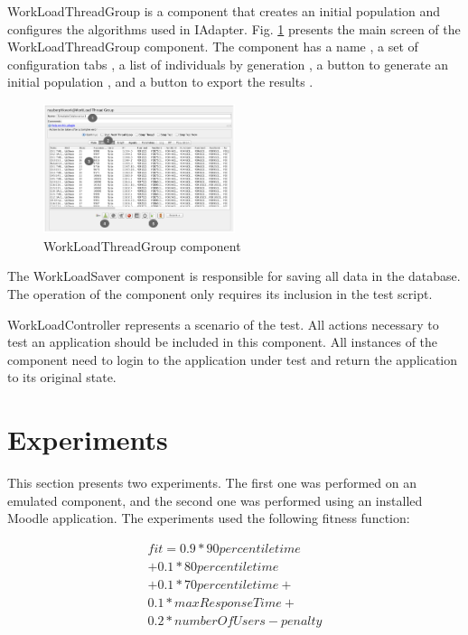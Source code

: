 \documentclass[conference]{IEEEtran}
\begin{document}
 
WorkLoadThreadGroup is a component that creates an initial population and configures the algorithms used in IAdapter. Fig. \ref{fig:tela1iadapter} presents the main screen of the WorkLoadThreadGroup component. The component has a name , a set of configuration tabs , a list of individuals by generation , a button to generate an initial population , and a button to export the results .

\begin{figure}[h]
\includegraphics[width=0.5\textwidth]{./images/tela1iadapter.png}
\caption{WorkLoadThreadGroup component}
\label{fig:tela1iadapter}
\end{figure}

The WorkLoadSaver component is responsible for saving all data in the database. The operation of the component only requires its inclusion in the test script.

WorkLoadController represents a scenario of the test. All actions necessary to test an application should be included in this component. All instances of the component need to login to the application under test and return the application to its original state.




\section{Experiments}

This section presents two experiments. The first one was performed on an emulated component, and the second one was performed using an installed Moodle application. The experiments used the following fitness function:

\begin{equation}
\begin{aligned}
fit=0.9* 90percentiletime\\
+0.1*80percentiletime\\+
0.1*70percentiletime+\\
0.1*maxResponseTime+\\
0.2*numberOfUsers-penalty
\end{aligned}
\end{equation}
\end{document}
